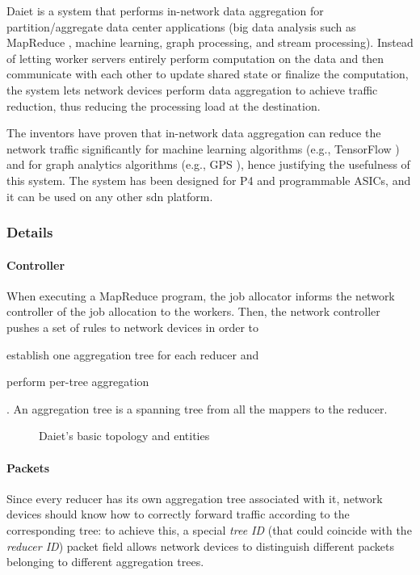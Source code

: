 Daiet \cite{daiet} is a system that performs in-network data aggregation for partition/aggregate data center applications (big data analysis such as MapReduce \cite{mapreduce}, machine learning, graph processing, and stream processing).
Instead of letting worker servers entirely perform computation on the data and then communicate with each other to update shared state or finalize the computation, the system lets network devices perform data aggregation to achieve traffic reduction, thus reducing the processing load at the destination.\par
The inventors have proven that in-network data aggregation can reduce the network traffic significantly for machine learning algorithms (e.g., TensorFlow \cite{tensorflow}) and for graph analytics algorithms (e.g., GPS \cite{gps}), hence justifying the usefulness of this system. The system has been designed for P4 \cite{p4} and programmable ASICs, and it can be used on any other \gls{sdn} platform.

\subsubsection{Details}
\paragraph{Controller}
When executing a MapReduce program, the job allocator informs the network controller of the job allocation to the workers.
Then, the network controller pushes a set of rules to network devices in order to
\begin{mylist}
    \item establish one aggregation tree for each reducer and
    \item perform per-tree aggregation
\end{mylist}.
An aggregation tree is a spanning tree from all the mappers to the reducer.

\begin{figure}[!htb]
    \centering
    \usebox{\daietbasic}
    \caption{Daiet's \texorpdfstring{\cite{daiet}}{} basic topology and entities}
\end{figure}

\paragraph{Packets}
Since every reducer has its own aggregation tree associated with it, network devices should know how to correctly forward traffic according to the corresponding tree: to achieve this, a special \textit{tree ID} (that could coincide with the \textit{reducer ID}) packet field allows network devices to distinguish different packets belonging to different aggregation trees.

